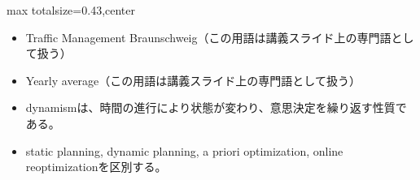 \clearpage
{}
\begin{minipage}[t]{0.405\textwidth}
\begin{adjustbox}{max totalsize={\textwidth}{0.43\textheight},center}
\begin{minipage}{\textwidth}\scriptsize
{}\begin{itemize}
\item Traffic Management Braunschweig（この用語は講義スライド上の専門語として扱う）
\item Yearly average（この用語は講義スライド上の専門語として扱う）
\end{itemize}\begin{itemize}
\item dynamismは、時間の進行により状態が変わり、意思決定を繰り返す性質である。
\item static planning, dynamic planning, a priori optimization, online reoptimizationを区別する。
\end{itemize}
\end{minipage}
\end{adjustbox}
\end{minipage}\hfill
